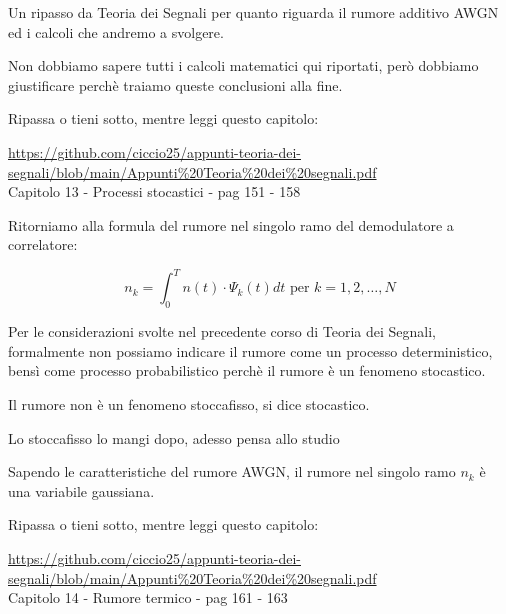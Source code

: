 \begin{tcolorbox}
    Un ripasso da Teoria dei Segnali per quanto riguarda il rumore additivo AWGN ed i calcoli che andremo a svolgere. \newline 

    Non dobbiamo sapere tutti i calcoli matematici qui riportati, però dobbiamo giustificare perchè traiamo queste conclusioni alla fine. \newline 

    Ripassa o tieni sotto, mentre leggi questo capitolo: \newline 

    \url{https://github.com/ciccio25/appunti-teoria-dei-segnali/blob/main/Appunti%20Teoria%20dei%20segnali.pdf} \\
    Capitolo 13 - Processi stocastici - pag 151 - 158
\end{tcolorbox}

Ritorniamo alla formula del rumore nel singolo ramo del demodulatore a correlatore: 

{
    \Large 
    \begin{equation}
        n_{k} 
        =
        \int_{0}^{T}
        n (t)
        \cdot 
        \Psi_k (t)
        dt 
        \text{ per } k = 1, 2, \dots, N
    \end{equation}
}

Per le considerazioni svolte nel precedente corso di Teoria dei Segnali, 
formalmente non possiamo indicare il rumore come un processo deterministico, 
bensì come processo probabilistico perchè il rumore è un fenomeno stocastico. \newline 

\begin{tcolorbox}
    Il rumore non è un fenomeno stoccafisso, si dice stocastico. \newline 

    Lo stoccafisso lo mangi dopo, adesso pensa allo studio
\end{tcolorbox}

Sapendo le caratteristiche del rumore AWGN, 
il rumore nel singolo ramo $n_k$ è una variabile gaussiana. \newline 

\begin{tcolorbox}
    Ripassa o tieni sotto, mentre leggi questo capitolo: \newline 

    \url{https://github.com/ciccio25/appunti-teoria-dei-segnali/blob/main/Appunti%20Teoria%20dei%20segnali.pdf} \\
    Capitolo 14 - Rumore termico - pag 161 - 163
\end{tcolorbox}


